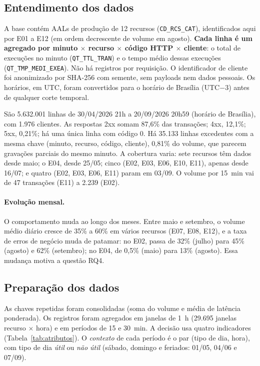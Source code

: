 \documentclass[sigconf,nonacm]{acmart}
\begin{document}
\subsection{Entendimento dos dados}
A base contém AALs de produção de 12 recursos (\texttt{CD\_RCS\_CAT}), identificados aqui por E01 a E12 (em ordem decrescente de volume em agosto). \textbf{Cada linha é um agregado por minuto $\times$ recurso $\times$ código HTTP $\times$ cliente}: o total de execuções no minuto (\texttt{QT\_TTL\_TRAN}) e o tempo médio dessas execuções (\texttt{QT\_TMP\_MEDI\_EXEA}). Não há registros por requisição. O identificador de cliente foi anonimizado por SHA-256 com semente, sem payloads nem dados pessoais. Os horários, em UTC, foram convertidos para o horário de Brasília (UTC$-3$) antes de qualquer corte temporal.

São 5.632.001 linhas de 30/04/2026 21h a 20/09/2026 20h59 (horário de Brasília), com 1.976 clientes. As respostas 2xx somam 87,6\% das transações; 4xx, 12,1\%; 5xx, 0,21\%; há uma única linha com código 0. Há 35.133 linhas excedentes com a mesma chave (minuto, recurso, código, cliente), 0,81\% do volume, que parecem gravações parciais do mesmo minuto. A cobertura varia: sete recursos têm dados desde maio; o E04, desde 25/05; cinco (E02, E03, E06, E10, E11), apenas desde 16/07; e quatro (E02, E03, E06, E11) param em 03/09. O volume por 15~min vai de 47 transações (E11) a 2.239 (E02).

\paragraph{Evolução mensal.} O comportamento muda ao longo dos meses. Entre maio e setembro, o volume médio diário cresce de 35\% a 60\% em vários recursos (E07, E08, E12), e a taxa de erros de negócio muda de patamar: no E02, passa de 32\% (julho) para 45\% (agosto) e 62\% (setembro); no E04, de 0,5\% (maio) para 13\% (agosto). Essa mudança motiva a questão RQ4.

\subsection{Preparação dos dados}
As chaves repetidas foram consolidadas (soma do volume e média de latência ponderada). Os registros foram agregados em janelas de 1~h (29.695 janelas recurso $\times$ hora) e em períodos de 15 e 30~min. A decisão usa quatro indicadores (Tabela~\ref{tab:atributos}). O \emph{contexto} de cada período é o par (tipo de dia, hora), com tipo de dia \emph{útil} ou \emph{não útil} (sábado, domingo e feriados: 01/05, 04/06 e 07/09).
\end{document}
